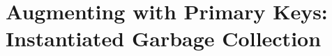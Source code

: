 \documentclass{article}
\numberwithin{equation}{section}
\renewcommand{\tt}[1]{\ifmmode\text{\texttt{#1}}\else\texttt{#1}\fi}
\begin{document}







\section{Augmenting with Primary Keys: Instantiated Garbage Collection}
\label{sec:augment:instantiated}
\end{document}
